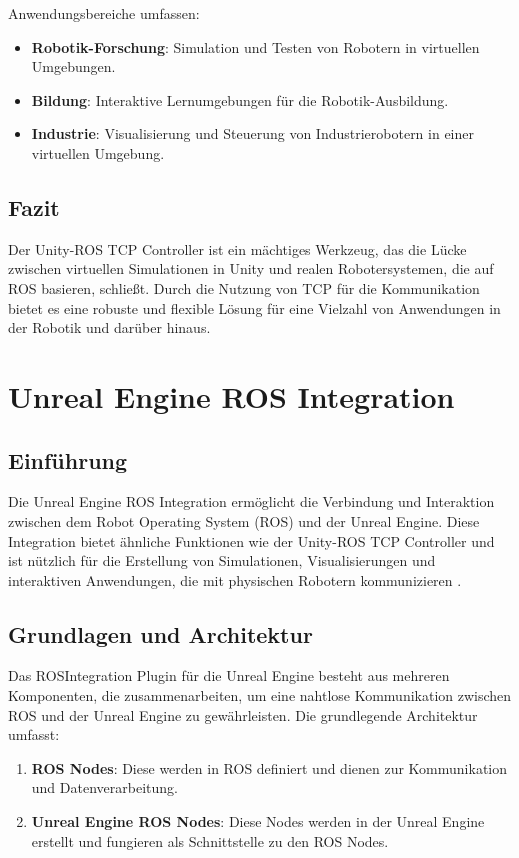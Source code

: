 Anwendungsbereiche umfassen:

\begin{itemize}
    \item \textbf{Robotik-Forschung}: Simulation und Testen von Robotern in virtuellen Umgebungen.
    \item \textbf{Bildung}: Interaktive Lernumgebungen für die Robotik-Ausbildung.
    \item \textbf{Industrie}: Visualisierung und Steuerung von Industrierobotern in einer virtuellen Umgebung.
\end{itemize}

\subsection{Fazit}

Der Unity-ROS TCP Controller ist ein mächtiges Werkzeug, das die Lücke zwischen virtuellen Simulationen in Unity und realen Robotersystemen, die auf ROS basieren, schließt. Durch die Nutzung von TCP für die Kommunikation bietet es eine robuste und flexible Lösung für eine Vielzahl von Anwendungen in der Robotik und darüber hinaus.
\section{Unreal Engine ROS Integration}

\subsection{Einführung}

Die Unreal Engine ROS Integration ermöglicht die Verbindung und Interaktion zwischen dem Robot Operating System (ROS) und der Unreal Engine. Diese Integration bietet ähnliche Funktionen wie der Unity-ROS TCP Controller und ist nützlich für die Erstellung von Simulationen, Visualisierungen und interaktiven Anwendungen, die mit physischen Robotern kommunizieren \cite{ros_integration_github}.

\subsection{Grundlagen und Architektur}

Das ROSIntegration Plugin für die Unreal Engine besteht aus mehreren Komponenten, die zusammenarbeiten, um eine nahtlose Kommunikation zwischen ROS und der Unreal Engine zu gewährleisten. Die grundlegende Architektur umfasst:

\begin{enumerate}
    \item \textbf{ROS Nodes}: Diese werden in ROS definiert und dienen zur Kommunikation und Datenverarbeitung.
    \item \textbf{Unreal Engine ROS Nodes}: Diese Nodes werden in der Unreal Engine erstellt und fungieren als Schnittstelle zu den ROS Nodes.
\end{enumerate}

